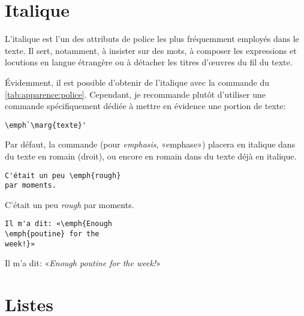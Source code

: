 \section{Italique}

L'italique est l'un des attributs de police les plus fréquemment
employés dans le texte. Il sert, notamment, à insister sur des mots, à
composer les expressions et locutions en langue étrangère ou à
détacher les titres d'{\oe}uvres du fil du texte.

Évidemment, il est possible d'obtenir de l'italique avec la commande
\cmd{\textit} du \autoref{tab:apparence:police}. Cependant, je
recommande plutôt d'utiliser une commande spécifiquement dédiée à
mettre en évidence une portion de texte:
\begin{lstlisting}
\emph`\marg{texte}'
\end{lstlisting}
Par défaut, la commande \cmd{\emph} (pour \emph{emphasis}, «emphase»)
placera  en italique dans du texte en romain (droit), ou
encore en romain dans du texte déjà en italique.
\begin{demo}
  \begin{texample}
\begin{lstlisting}
C'était un peu \emph{rough}
par moments.
\end{lstlisting}
    \producing
    C'était un peu \emph{rough} par moments.
  \end{texample}
  \begin{texample}
\begin{lstlisting}
Il m'a dit: «\emph{Enough
\emph{poutine} for the
week!}»
\end{lstlisting}
    \producing
    Il m'a dit: «\emph{Enough \emph{poutine} for the week!}»
  \end{texample}
\end{demo}



\section{Listes}
\label{sec:apparence:listes}

